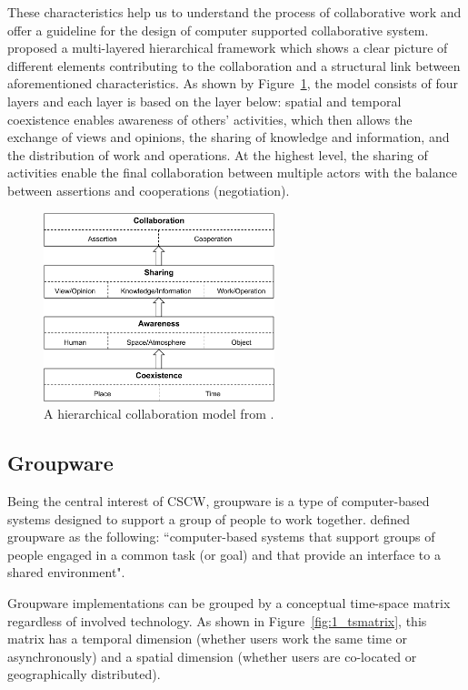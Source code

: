 These characteristics help us to understand the process of collaborative work and offer a guideline for the design of computer supported collaborative system. \citet{Okada2007Collab} proposed a multi-layered hierarchical framework which shows a clear picture of different elements contributing to the collaboration and a structural link between aforementioned characteristics. As shown by Figure~\ref{fig:1_collab_model}, the model consists of four layers and each layer is based on the layer below: spatial and temporal coexistence enables awareness of others' activities, which then allows the exchange of views and opinions, the sharing of knowledge and information, and the distribution of work and operations. At the highest level, the sharing of activities enable the final collaboration between multiple actors with the balance between assertions and cooperations (negotiation).

\begin{figure}[htb]
  \centering
  \includegraphics[width=0.6\textwidth]{figures/ch1/collab_model}
  \caption{\label{fig:1_collab_model}A hierarchical collaboration model from \citet{Okada2007Collab}.}
\end{figure}

\subsection{Groupware}
Being the central interest of CSCW, groupware is a type of computer-based systems designed to support a group of people to work together. \citet{Ellis1991Groupware} defined groupware as the following: ``computer-based systems that support groups of people engaged in a common task (or goal) and that provide an interface to a shared environment".

Groupware implementations can be grouped by a conceptual time-space matrix \citep{Johansen1988Groupware, Ellis1991Groupware} regardless of involved technology. As shown in Figure~\ref{fig:1_tsmatrix}, this matrix has a temporal dimension (whether users work the same time or asynchronously) and a spatial dimension (whether users are co-located or geographically distributed).

